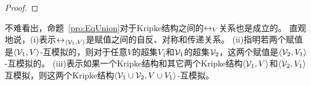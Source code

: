 \begin{proof}
%	
%	
\end{proof}

不难看出，命题~\ref{pro:EqUnion}对于Kripke结构之间的$\leftrightarrow_V$关系也是成立的。
直观地说，(i)表示$\leftrightarrow_{{\langle{{\cal V}_1,V}\rangle}}$是赋值之间的自反、对称和传递关系。
(ii)指明若两个赋值是${{\langle{{\cal V}_1,V}\rangle}}$-互模拟的，则对于任意$V$的超集$V_1$和${\cal V}_1$的超集${\cal V}_2$，这两个赋值是${{\langle{{\cal V}_2,V_1}\rangle}}$-互模拟的。
(iii)表示如果一个Kripke结构和其它两个Kripke结构${{\langle{{\cal V}_1,V}\rangle}}$和${{\langle{{\cal V}_2,V_1}\rangle}}$互模拟，则这两个Kripke结构${{\langle{{\cal V}_1 \cup {\cal V}_2,V \cup V_1}\rangle}}$-互模拟。%

